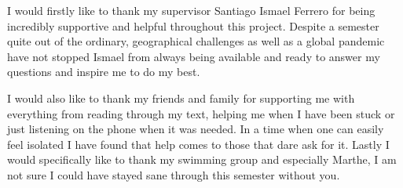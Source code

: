 I would firstly like to thank my supervisor Santiago Ismael Ferrero for being incredibly supportive and helpful throughout this project. Despite a semester quite out of the ordinary, geographical challenges as well as a global pandemic have not stopped Ismael from always being available and ready to answer my questions and inspire me to do my best.

I would also like to thank my friends and family for supporting me with everything from reading through my text, helping me when I have been stuck or just listening on the phone when it was needed. In a time when one can easily feel isolated I have found that help comes to those that dare ask for it. Lastly I would specifically like to thank my swimming group and especially Marthe, I am not sure I could have stayed sane through this semester without you.